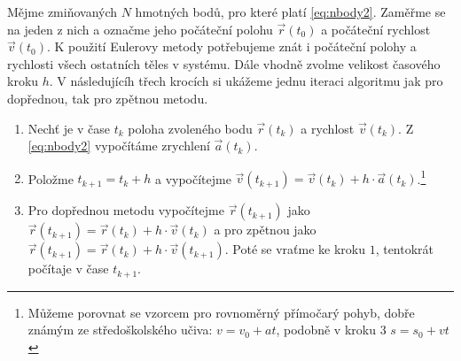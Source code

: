 \documentclass[A4paper, 12pt, oneside]{book}
\begin{document}
Mějme zmiňovaných $N$ hmotných bodů, pro které platí \eqref{eq:nbody2}. Zaměřme se na jeden z nich a označme jeho počáteční polohu $\vec{r}(t_0)$ a počáteční rychlost $\vec{v}(t_0)$. K použití Eulerovy metody potřebujeme znát i počáteční polohy a rychlosti všech ostatních těles v systému. Dále vhodně zvolme velikost časového kroku $h$. V následujícíh třech krocích si ukážeme jednu iteraci algoritmu jak pro dopřednou, tak pro zpětnou metodu.

\begin{enumerate}
	\item Nechť je v čase $t_k$ poloha zvoleného bodu $\vec{r}(t_k)$ a rychlost $\vec{v}(t_k)$. Z \eqref{eq:nbody2} vypočítáme zrychlení $\vec{a}(t_k)$. 
	\item Položme $t_{k+1} = t_{k}+h$ a vypočítejme $\vec{v}(t_{k+1}) = \vec{v}(t_k) + h\cdot\vec{a}(t_k)$.\footnote{Můžeme porovnat se vzorcem pro rovnoměrný přímočarý pohyb, dobře známým ze středoškolského učiva: $v = v_0 + at$, podobně v kroku $3$ $s = s_0 + vt$}
	\item Pro dopřednou metodu vypočítejme $\vec{r}(t_{k+1})$ jako $\vec{r}(t_{k+1}) = \vec{r}(t_k) + h\cdot\vec{v}(t_k)$ a pro zpětnou jako $\vec{r}(t_{k+1}) = \vec{r}(t_k) + h\cdot\vec{v}(t_{k+1})$. Poté se vraťme ke kroku $1$, tentokrát počítaje v čase $t_{k+1}$. 
\end{enumerate}
\end{document}

